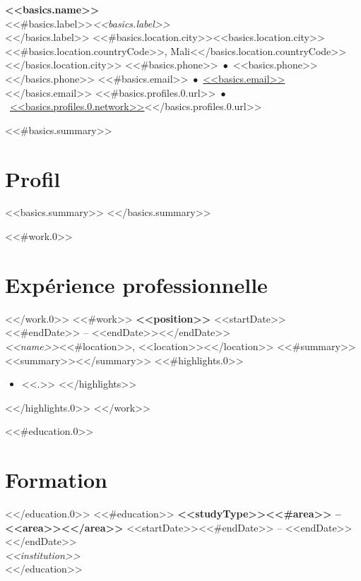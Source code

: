 \documentclass[11pt,a4paper]{article}
\begin{document}
\begin{center}
{\Huge\bfseries <<basics.name>>}\\[3pt]
<<#basics.label>>{\large\itshape <<basics.label>>}\\[6pt]<</basics.label>>
\small
<<#basics.location.city>><<basics.location.city>><<#basics.location.countryCode>>, Mali<</basics.location.countryCode>><</basics.location.city>>
<<#basics.phone>>~$\bullet$~<<basics.phone>><</basics.phone>>
<<#basics.email>>~$\bullet$~\href{mailto:<<basics.email>>}{<<basics.email>>}<</basics.email>>
<<#basics.profiles.0.url>>~$\bullet$~\href{<<basics.profiles.0.url>>}{<<basics.profiles.0.network>>}<</basics.profiles.0.url>>
\end{center}

\vspace{4pt}

<<#basics.summary>>
\section*{Profil}
<<basics.summary>>
<</basics.summary>>

<<#work.0>>\section*{Expérience professionnelle}<</work.0>>
<<#work>>
\noindent\textbf{<<position>>} \hfill <<startDate>><<#endDate>> -- <<endDate>><</endDate>>\\
\textit{<<name>>}<<#location>>, <<location>><</location>>
<<#summary>>\\<<summary>><</summary>>
<<#highlights.0>>
\begin{itemize}
<<#highlights>>\item <<.>>
<</highlights>>
\end{itemize}
<</highlights.0>>
\vspace{4pt}
<</work>>

<<#education.0>>\section*{Formation}<</education.0>>
<<#education>>
\noindent\textbf{<<studyType>><<#area>> -- <<area>><</area>>} \hfill <<startDate>><<#endDate>> -- <<endDate>><</endDate>>\\
\textit{<<institution>>}\\[4pt]
<</education>>
\end{document}
